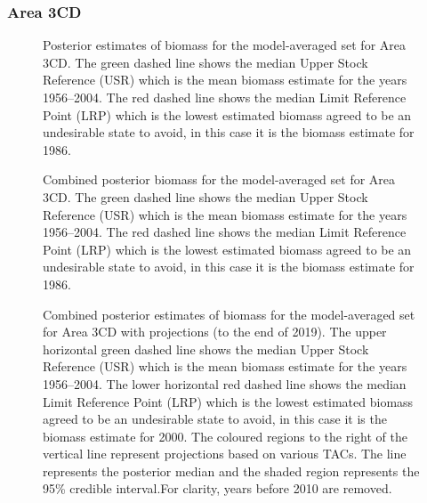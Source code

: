 \documentclass[11pt]{book}
\begin{document}
\hypertarget{area-3cd}{%
\subsubsection{Area 3CD}\label{area-3cd}}
\begin{figure}[htb]

{\centering {} 

}

\caption{Posterior estimates of biomass for the model-averaged set for Area 3CD. The green dashed line shows the median Upper Stock Reference (USR) which is the mean biomass estimate for the years 1956--2004. The red dashed line shows the median Limit Reference Point (LRP) which is the lowest estimated biomass agreed to be an undesirable state to avoid, in this case it is the biomass estimate for 1986.}\label{fig:fig-model-average-biomass-comp-3cd}
\end{figure}
\clearpage
\begin{figure}[htb]

{\centering {} 

}

\caption{Combined posterior biomass for the model-averaged set for Area 3CD.  The green dashed line shows the median Upper Stock Reference (USR) which is the mean biomass estimate for the years 1956--2004. The red dashed line shows the median Limit Reference Point (LRP) which is the lowest estimated biomass agreed to be an undesirable state to avoid, in this case it is the biomass estimate for 1986.}\label{fig:fig-model-average-biomass-3cd}
\end{figure}
\clearpage
\begin{figure}[htb]

{\centering {} 

}

\caption{Combined posterior estimates of biomass for the model-averaged set for Area 3CD with projections (to the end of 2019).  The upper horizontal green dashed line shows the median Upper Stock Reference (USR) which is the mean biomass estimate for the years 1956--2004. The lower horizontal red dashed line shows the median Limit Reference Point (LRP) which is the lowest estimated biomass agreed to be an undesirable state to avoid, in this case it is the biomass estimate for 2000. The coloured regions to the right of the vertical line represent projections based on various TACs. The line represents the posterior median and the shaded region represents the 95\% credible interval.For clarity, years before 2010 are removed.}\label{fig:fig-model-average-biomass-3cd-proj}
\end{figure}
\clearpage
\end{document}
